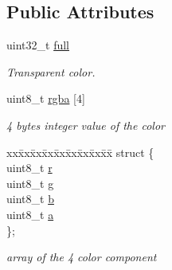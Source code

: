 \subsection*{Public Attributes}
\begin{DoxyCompactItemize}
\item 
uint32\-\_\-t \hyperlink{unionarcade_1_1_color_ad68cc4b72cafa2c89dac97a336d1ca32}{full}
\begin{DoxyCompactList}\small\item\em Transparent color. \end{DoxyCompactList}\item 
uint8\-\_\-t \hyperlink{unionarcade_1_1_color_a805bb231543d607ee00f353506c850be}{rgba} \mbox{[}4\mbox{]}
\begin{DoxyCompactList}\small\item\em 4 bytes integer value of the color \end{DoxyCompactList}\item 
\begin{tabbing}
xx\=xx\=xx\=xx\=xx\=xx\=xx\=xx\=xx\=\kill
struct \{\\
\>uint8\_t \hyperlink{unionarcade_1_1_color_a20637c0cb142a384bd034cceacafe6e0}{r}\\
\>uint8\_t \hyperlink{unionarcade_1_1_color_a97c509df99c9b119622f4b2ff8b3f21b}{g}\\
\>uint8\_t \hyperlink{unionarcade_1_1_color_a7edec98cabcfdeb71ae750e7442a6baf}{b}\\
\>uint8\_t \hyperlink{unionarcade_1_1_color_ae2f888f27d844d24f9ef10917f42d2dc}{a}\\
\}; \\

\end{tabbing}\begin{DoxyCompactList}\small\item\em array of the 4 color component \end{DoxyCompactList}\end{DoxyCompactItemize}
